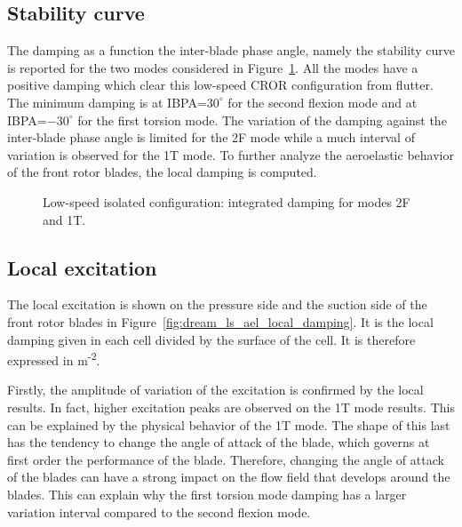
\subsection{Stability curve}
\label{sub:dream_ls_ael_curve}

The damping as a function the inter-blade phase angle, namely the stability
curve is reported for the two modes considered in Figure~\ref{fig:dream_ls_ael_damping}.
All the modes have a positive damping which clear this low-speed CROR configuration
from flutter. The minimum damping is at IBPA=$30^\circ$ for the second flexion
mode and at IBPA=$-30^\circ$ for the first torsion mode.
The variation of the damping against the inter-blade phase angle is
limited for the 2F mode while a much interval of variation is
observed for the 1T mode. To further analyze the aeroelastic behavior
of the front rotor blades, the local damping is computed.
\begin{figure}[htp]
  \centering
  \caption{Low-speed isolated configuration: integrated damping for modes 2F and 1T.}
  \label{fig:dream_ls_ael_damping}
\end{figure}

\subsection{Local excitation}
\label{sub:dream_ls_ael_local_damping}

The local excitation is shown on the pressure side and
the suction side of the front rotor blades in 
Figure~\ref{fig:dream_ls_ael_local_damping}. It is the
local damping given in each cell divided by the 
surface of the cell. It is therefore expressed in
m\textsuperscript{-2}.

Firstly, the amplitude of variation of the excitation
is confirmed by the local results. In fact, higher excitation peaks
are observed on the 1T mode results. This can be explained
by the physical behavior of the 1T mode. The shape of this last
has the tendency to change the angle of attack of the blade,
which governs at first order the
performance of the blade. Therefore, changing the angle of attack
of the blades can have a strong impact on the flow field
that develops around the blades. This can explain why the
first torsion mode damping has a larger variation interval
compared to the second flexion mode.

